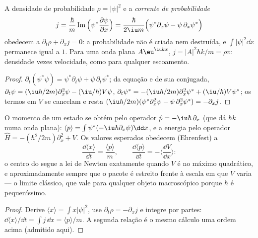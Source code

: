 \begin{proposition}\label{prop:b2:schrodinger-wave-functions:current}
A densidade de probabilidade $\rho = |\psi|^2$ e a \emph{corrente de
probabilidade}
\[
j = \frac{\hbar}{m}\operatorname{Im}\Big(\psi^*\frac{\partial\psi}{\partial x}\Big)
= \frac{\hbar}{2\iu m}\Big(\psi^*\partial_x\psi - \psi\,\partial_x\psi^*\Big)
\]
obedecem a $\partial_t\rho + \partial_xj = 0$: a probabilidade não é criada nem
destruída, e $\int|\psi|^2\dd x$ permanece igual a $1$. Para uma onda plana
$A\eu^{\iu kx}$, $j = |A|^2\hbar k/m = \rho v$: densidade vezes velocidade, como para
qualquer escoamento.
\end{proposition}

\begin{proof}
$\partial_t(\psi^*\psi) = \psi^*\partial_t\psi + \psi\,\partial_t\psi^*$; da
equação e de sua conjugada, $\partial_t\psi = (\iu\hbar/2m)\partial_x^2\psi -
(\iu/\hbar)V\psi$, $\partial_t\psi^* = -(\iu\hbar/2m)\partial_x^2\psi^* +
(\iu/\hbar)V\psi^*$; os termos em $V$ se cancelam e resta $(\iu\hbar/2m)(\psi^*
\partial_x^2\psi - \psi\,\partial_x^2\psi^*) = -\partial_xj$.
\end{proof}

\begin{proposition}\label{prop:b2:schrodinger-wave-functions:ehrenfest}
O momento de um estado se obtém pelo operador $\hat p =
-\iu\hbar\,\partial_x$ (que dá $\hbar k$ numa onda plana): $\langle
p\rangle = \int\psi^*(-\iu\hbar\partial_x\psi)\dd x$, e a energia pelo operador $\hat H
= -(\hbar^2/2m)\partial_x^2 + V$. Os valores esperados obedecem
(Ehrenfest) a
\[
\frac{\dd\langle x\rangle}{\dd t} = \frac{\langle p\rangle}{m}, \qquad
\frac{\dd\langle p\rangle}{\dd t} = -\Big\langle\frac{\dd V}{\dd x}\Big\rangle :
\]
o centro do  segue a lei de Newton exatamente quando $V$ é
no máximo quadrático, e aproximadamente sempre que o pacote é estreito
frente à escala em que $V$ varia --- o limite clássico,
que vale para qualquer objeto macroscópico porque $\hbar$ é pequeníssimo.
\end{proposition}

\begin{proof}
Derive $\langle x\rangle = \int x|\psi|^2$, use $\partial_t\rho =
-\partial_xj$ e integre por partes: $\dd\langle x\rangle/\dd t = \int j\,\dd x
= \langle p\rangle/m$. A segunda relação é o mesmo cálculo uma
ordem acima (admitido aqui).
\end{proof}


